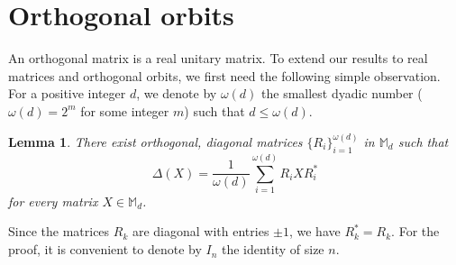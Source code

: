 \documentclass[12pt,reqno]{article}
\newtheorem{lemma}[theorem]{Lemma}
\theoremstyle{definition}
\theoremstyle{remark}
\numberwithin{equation}{section}
\def\bM{\mathbb{M}}
\begin{document}
\section{Orthogonal orbits}

An orthogonal matrix is a real unitary matrix. To extend our results to real matrices and orthogonal orbits, we first need the following simple observation.
For a positive integer $d$, we denote by $\omega(d)$ the smallest dyadic number ($\omega(d)=2^m$ for some integer $m$) such that $d\le \omega(d)$.

\vskip 5pt
\begin{lemma}\label{real}  There exist  orthogonal, diagonal matrices  $\{R_i\}_{i=1}^{\omega(d)}$  in $\bM_d$ such that 
$$
\Delta(X) =\frac{1}{\omega(d)}\sum_{i=1}^{\omega(d)} R_iXR_i^*
$$
for every matrix $X\in\bM_d$.
\end{lemma}

\vskip 5pt
Since the matrices $R_k$
 are diagonal with entries $\pm1$, we have $R_k^*=R_k$. For the proof, it is convenient to denote by $I_n$ the identity of size $n$.
\end{document}
